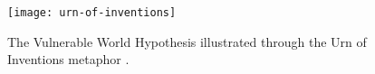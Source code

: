 \begin{figure}[h!]
  \centering
  \texttt{[image: urn-of-inventions]}
    \caption[The Vulnerable World Hypothesis]
    {The Vulnerable World Hypothesis illustrated through the Urn of Inventions metaphor \citep{bostrom2019}.}
    \label{fig8:vwh}
\end{figure}
